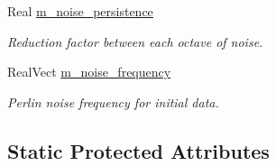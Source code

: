 \begin{DoxyCompactItemize}
Real \hyperlink{classair__bolsig_a85a379381c3ed1c8c13ae72fed18a1eb}{m\+\_\+noise\+\_\+persistence}
\begin{DoxyCompactList}\small\item\em Reduction factor between each octave of noise. \end{DoxyCompactList}\item 
Real\+Vect \hyperlink{classair__bolsig_aca54e455884cc4d3f5c77bcd6dcd9f76}{m\+\_\+noise\+\_\+frequency}
\begin{DoxyCompactList}\small\item\em Perlin noise frequency for initial data. \end{DoxyCompactList}\end{DoxyCompactItemize}
\subsection*{Static Protected Attributes}
